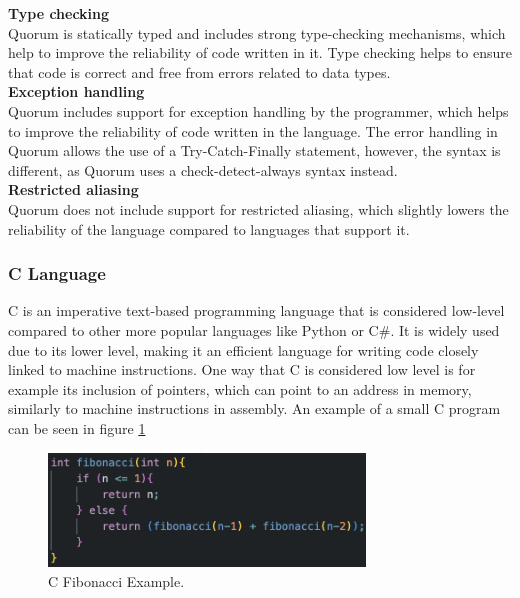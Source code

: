 \noindent\textbf{Type checking}\\
\noindent Quorum is statically typed and includes strong type-checking mechanisms, which help to improve the reliability of code written in it. Type checking helps to ensure that code is correct and free from errors related to data types.\\ 


\noindent\textbf{Exception handling}\\
\noindent Quorum includes support for exception handling by the programmer, which helps to improve the reliability of code written in the language. The error handling in Quorum allows the use of a Try-Catch-Finally statement, however, the syntax is different, as Quorum uses a check-detect-always syntax instead. \\


\noindent \textbf{Restricted aliasing}\\
\noindent Quorum does not include support for restricted aliasing, which slightly lowers the reliability of the language compared to languages that support it.


\subsubsection{C Language}
C is an imperative text-based programming language that is considered low-level compared to other more popular languages like Python or C\#\cite{WikiCLang}. It is widely used due to its lower level, making it an efficient language for writing code closely linked to machine instructions. One way that C is considered low level is for example its inclusion of pointers, which can point to an address in memory, similarly to machine instructions in assembly\cite{WikiCLang}. An example of a small C program can be seen in figure \ref{codeEx:C}

\begin{figure}[H] 
    \begin{center}
        \includegraphics[width=0.75\textwidth]{Files/Billeder: Analyse/CFiboExample.png}
    \end{center}
    \caption{C Fibonacci Example.}
    \label{codeEx:C}
\end{figure}


